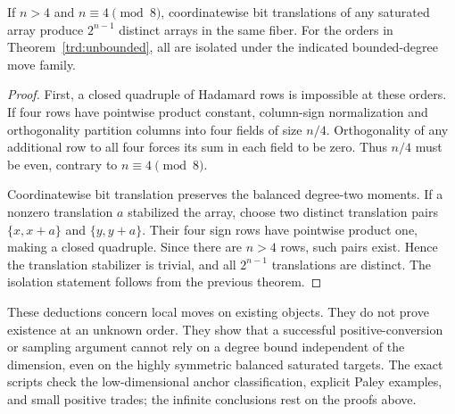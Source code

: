 \begin{proposition}
If $n>4$ and $n\equiv4\pmod8$, coordinatewise bit translations of
any saturated array produce $2^{n-1}$ distinct arrays in the same fiber.
For the orders in Theorem~\ref{trd:unbounded}, all are isolated under
the indicated bounded-degree move family.
\end{proposition}
\begin{proof}
First, a closed quadruple of Hadamard rows is impossible at these
orders. If four rows have pointwise product constant, column-sign
normalization and orthogonality partition columns into four fields
of size $n/4$. Orthogonality of any additional row to all four forces
its sum in each field to be zero. Thus $n/4$ must be even, contrary
to $n\equiv4\pmod8$.

Coordinatewise bit translation preserves the balanced degree-two
moments. If a nonzero translation $a$ stabilized the array, choose
two distinct translation pairs $\{x,x+a\}$ and $\{y,y+a\}$. Their four
sign rows have pointwise product one, making a closed quadruple.
Since there are $n>4$ rows, such pairs exist. Hence the translation
stabilizer is trivial, and all $2^{n-1}$ translations are distinct.
The isolation statement follows from the previous theorem.
\end{proof}

These deductions concern local moves on existing objects. They do not
prove existence at an unknown order. They show that a successful
positive-conversion or sampling argument cannot rely on a degree bound
independent of the dimension, even on the highly symmetric balanced
saturated targets. The exact scripts check the low-dimensional anchor
classification, explicit Paley examples, and small positive trades; the
infinite conclusions rest on the proofs above.

